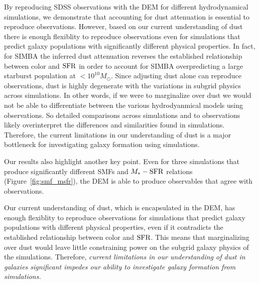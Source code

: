 By reproducing SDSS observations with the DEM for different hydrodynamical
simulations, we demonstrate that accounting for dust attenuation is essential 
to reproduce observations. However, based on our current understanding of dust
there is enough flexiblity to reproduce observations even for simulations that
predict galaxy populations with significantly different physical properties. 
In fact, for SIMBA the inferred dust attenuation reverses the established 
relationship between color and ${\rm SFR}$ in order to account for SIMBA
overpredicting a large starburst population at $<10^{10}M_\odot$. Since
adjusting dust alone can reproduce observations, dust is highly degenerate with the variations in
subgrid physics across simulations. In other words, if we were to marginalize
over dust we would not be able to differentiate between the various
hydrodyanmical models using observations. So detailed comparisons across
simulations and to observations likely overinterpret the differences and
similarities found in simulations. Therefore, the current limitations in our
understanding of dust is a major bottleneck for investigating galaxy formation
using simulations.



Our results also highlight another key point. Even for three
simulations that produce significantly different SMFs and $M_*-{\rm SFR}$ relations
(Figure~\ref{fig:smf_msfr}), the DEM is able to produce observables that agree
with observations. 



Our current understanding of dust, which is
encapsulated in the DEM, has enough flexiblity to reproduce observations 
for simulations that predict galaxy populations with different physical
properties, even if it contradicts the established relationship between color
and ${\rm SFR}$. This means that marginalizing over dust would leave little 
constraining power on the subgrid galaxy physics of the simulations. 
Therefore, \emph{current limitations in our understanding of dust in 
galaxies significant impedes our ability to investigate galaxy 
formation from simulations.}



